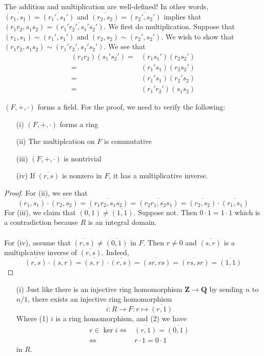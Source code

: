 \vspace{2ex}
\begin{rmk}
The addition and multiplication are well-defined! In other words,
$\overline{(r_1,s_1)}=\overline{(r_1',s_1')}$ and $\overline{(r_2,s_2)}=\overline{(r_2',s_2')}$ implies that $\overline{(r_1r_2,s_1s_2)}=\overline{(r_1'r_2',s_1's_2')}$. We first do multiplication. Suppose that $(r_1,s_1)\sim (r_1',s_1')$ and $(r_2,s_2)\sim (r_2',s_2')$. We wish to show that $(r_1r_2,s_1s_2)\sim (r_1'r_2',s_1's_2')$. We see that
\begin{align*}
(r_1r_2)(s_1's_2')=&(r_1s_1')(r_2s_2')\\
=&(r_1's_1)(r_2s_2')\\
=&(r_1's_1)(r_2's_2)\\
=&(r_1'r_2')(s_1s_2)
\end{align*}
\end{rmk}
\vspace{2ex}
\begin{prop}
$(F,+,\cdot )$ forms a field. For the proof, we need to verify the following:
\begin{itemize}
\item[(i)] $(F,+,\cdot )$ forms a ring
\item[(ii)] The multiplcation on $F$ is commutative
\item[(iii)] $(F,+,\cdot )$ is nontrivial
\item[(iv)] If $\overline{(r,s)}$ is nonzero in $F$, it has a multiplicative inverse.
\end{itemize}
\end{prop}
\vspace{2ex}
\begin{proof}
For (ii), we see that  
\[\overline{(r_1,s_1)}\cdot \overline{(r_2,s_2)}=\overline{(r_1r_2,s_1s_2)}=\overline{(r_2r_1,s_2s_1)}=\overline{(r_2,s_2)}\cdot \overline{(r_1,s_1)}\]
For (iii), we claim that $\overline{(0,1)}\ne \overline{(1,1)}$. Suppose not. Then $0\cdot 1=1\cdot 1$ which is a contradiction because $R$ is an integral domain.\\\\
For (iv), assume that $\overline{(r,s)}\ne \overline{(0,1)}$ in $F$. Then $r\ne 0$ and $\overline{(s,r)}$ is a multiplcative inverse of $\overline{(r,s)}$. Indeed, 
\[
\overline{(r,s)}\cdot \overline{(s,r)}=\overline{(s,r)}\cdot \overline{(r,s)}=\overline{(sr,rs)}=\overline{(rs,sr)}=\overline{(1,1)}\]
\end{proof}
\vspace{2ex}
\begin{rmk}
\begin{itemize}
\item[(i)] Just like there is an injective ring homomorphism ${\bm Z}\rightarrow {\bm Q}$ by sending $n$ to $n/1$, there exists an injective ring homomorphism 
\[i:R\rightarrow F:r\mapsto \overline{(r,1)}\] 
Where (1) $i$ is a ring homomorphism, and (2) we have
\begin{align*}
r\in \mathop{\mathrm{ker}}i\iff & \overline{(r,1)}=\overline{(0,1)}\\
\iff & r\cdot 1=0\cdot 1
\end{align*}
in $R$.
\end{itemize}
\end{rmk}
